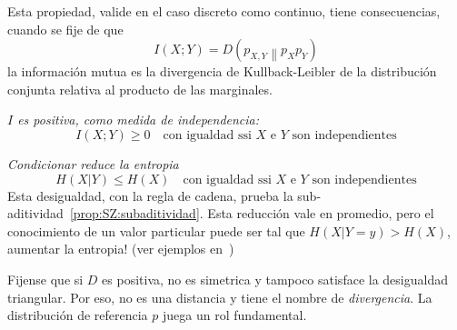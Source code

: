 
Esta propiedad, valide  en el caso discreto como  continuo, tiene consecuencias,
cuando  se fije  de que
%
\[
I(X;Y) = D \left( \left. p_{X,Y} \right\| p_X p_Y \right)
\]
%
\ie  la  informaci\'on  mutua  es  la  divergencia  de  Kullback-Leibler  de  la
distribuci\'on conjunta relativa al producto de las marginales.
%
\begin{propiedades}
\item\label{prop:SZ:Ipositive}   {\it   $I$   es   positiva,  como   medida   de
    independencia:}
  \[
  I(X;Y) \ge 0 \quad \mbox{con igualdad ssi $X$ e $Y$ son independientes}
  \]
%
\item\label{prop:SZ:condicionar} {\it  Condicionar reduce la  entropia}
  \[
  H(X|Y) \le H(X) \quad \mbox{con igualdad ssi $X$ e $Y$ son independientes}
  \]
  Esta    desigualdad,     con    la     regla    de    cadena,     prueba    la
  sub-aditividad~\ref{prop:SZ:subaditividad}.    Esta    reducci\'on   vale   en
  promedio, pero el conocimiento de un valor particular puede ser tal que $H(X|Y
  = y) > H(X)$, \ie aumentar la entropia!  (ver ejemplos en~\cite[p.~59]{Rio07})
\end{propiedades}

Fijense  que  si  $D$ es  positiva,  no  es  simetrica  y tampoco  satisface  la
desigualdad triangular. Por  eso, no es una distancia y tiene  el nombre de {\it
  divergencia}. La distribuci\'on de referencia $p$ juega un rol fundamental.